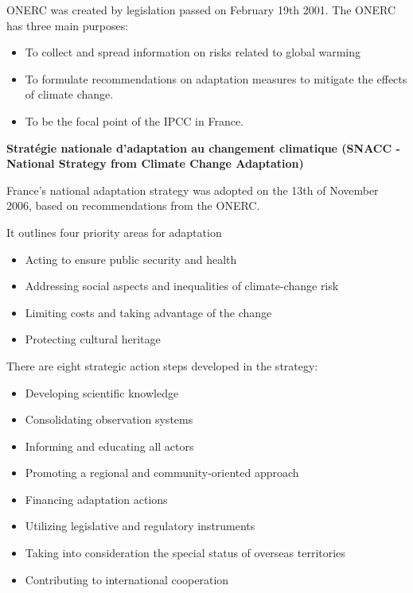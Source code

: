 ONERC was created by legislation passed on February 19th 2001. The ONERC has three main purposes:
\begin{itemize}
	\item To collect and spread information on risks related to global warming
	\item To formulate recommendations on adaptation measures to mitigate the effects of climate change.
	\item To be the focal point of the IPCC in France.
\end{itemize}




\textbf{Stratégie nationale d’adaptation au changement climatique (SNACC - National Strategy from Climate Change Adaptation)}



France’s national adaptation strategy was adopted on the 13th of November 2006, based on recommendations from the ONERC. 



It outlines four priority areas for adaptation
\begin{itemize}
	\item Acting to ensure public security and health
	\item Addressing social aspects and inequalities of climate-change risk
	\item Limiting costs and taking advantage of the change
	\item Protecting cultural heritage
\end{itemize}


There are eight strategic action steps developed in the strategy:
\begin{itemize}
	\item Developing scientific knowledge
	\item Consolidating observation systems
	\item Informing and educating all actors
	\item Promoting a regional and community-oriented approach
	\item Financing adaptation actions
	\item Utilizing legislative and regulatory instruments
	\item Taking into consideration the special status of overseas territories
	\item Contributing to international cooperation
\end{itemize}



